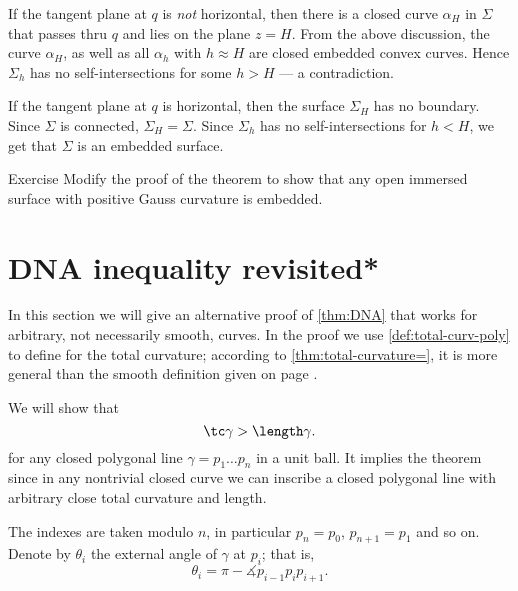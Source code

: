 If the tangent plane at $q$ is {}\emph{not} horizontal, 
then there is a closed curve $\alpha_H$ in $\Sigma$ that passes thru $q$ and lies on the plane $z=H$.
From the above discussion, the curve $\alpha_H$, as well as all $\alpha_h$ with $h\approx H$ are closed embedded convex curves.
Hence $\Sigma_h$ has no self-intersections for some $h>H$ --- a contradiction.

If the tangent plane at $q$ is horizontal,
then the surface $\Sigma_H$ has no boundary.
Since $\Sigma$ is connected, $\Sigma_H=\Sigma$.
Since $\Sigma_h$ has no self-intersections for $h<H$, we get that $\Sigma$ is an embedded surface.
\qeds

\begin{thm}{Exercise}
Modify the proof of the theorem to show that any open immersed surface with positive Gauss curvature is embedded.
\end{thm}




























\section*{DNA inequality revisited*}

In this section we will give an alternative proof of \ref{thm:DNA} that works for arbitrary, not necessarily smooth, curves.
In the proof we use \ref{def:total-curv-poly} to define for the total curvature;
according to \ref{thm:total-curvature=}, it is more general than the smooth definition given on page \pageref{page:total curvature of:smooth-def}.

We will show that 
\[\tc\gamma> \length\gamma.\]
for any closed polygonal line $\gamma=p_1\dots p_{n}$ in a unit ball.
It implies the theorem since in any nontrivial closed curve we can inscribe a closed polygonal line with arbitrary close total curvature and length.

The indexes are taken modulo $n$, in particular $p_{n}=p_0$, $p_{n+1}=p_1$ and so on.
Denote by $\theta_i$ the external angle of $\gamma$ at $p_i$;
that is,
\[\theta_i=\pi-\measuredangle p_{i-1}p_ip_{i+1}.\]

